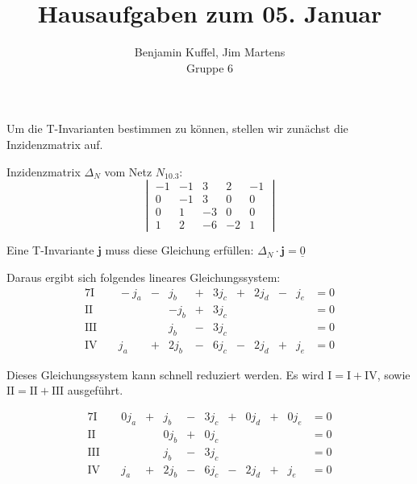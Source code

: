 \documentclass[10pt,a4paper,oneside,ngerman,numbers=noenddot]{scrartcl}
\renewcommand{\vec}[1]{\underline{#1}}
\begin{document}
\author{Benjamin Kuffel, Jim Martens\\Gruppe 6}
\title{Hausaufgaben zum 05. Januar}
\maketitle

\setcounter{section}{2}
\section{} %
\subsection{}
Um die T-Invarianten bestimmen zu können, stellen wir zunächst die Inzidenzmatrix auf.

Inzidenzmatrix \(\Delta_N\) vom Netz \(N_{10.3}\):
\[
	\begin{vmatrix}
		-1 & -1 & 3 & 2 & -1 \\
		0 & -1 & 3 & 0 & 0 \\
		0 & 1 & -3 & 0 & 0 \\
		1 & 2 & -6 & -2 & 1
	\end{vmatrix}
\]

Eine T-Invariante \(\textbf{j}\) muss diese Gleichung erfüllen: \(\Delta_N \cdot \textbf{j} = \vec{0}\)

Daraus ergibt sich folgendes lineares Gleichungssystem:
\begin{alignat*}{7}
	\text{I} && \; -j_a &-& j_b &+& 3j_c &+& 2j_d &-& j_e &= 0 \\
	\text{II} && && -j_b &+& 3j_c && && &= 0 \\
	\text{III} && && j_b &-& 3j_c && && &= 0 \\
	\text{IV} && \; j_a &+& 2j_b &-& 6j_c &-& 2j_d &+& j_e &= 0
\end{alignat*}

Dieses Gleichungssystem kann schnell reduziert werden. Es wird \(\text{I} = \text{I} + \text{IV}\), sowie \(\text{II} = \text{II} + \text{III}\) ausgeführt.

\begin{alignat*}{7}
	\text{I} && \; 0j_a &+& j_b &-& 3j_c &+& 0j_d &+& 0j_e &= 0 \\
	\text{II} && && 0j_b &+& 0j_c && && &= 0 \\
	\text{III} && && j_b &-& 3j_c && && &= 0 \\
	\text{IV} && \; j_a &+& 2j_b &-& 6j_c &-& 2j_d &+& j_e &= 0
\end{alignat*}
\end{document}
